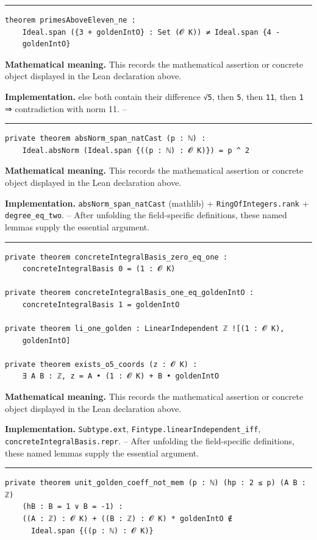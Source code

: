 \documentclass[UTF8,a4paper,11pt,fontset=fandol]{ctexart}
\theoremstyle{definition}
\newcommand{\statementsep}{\par\medskip\hrule\medskip}
\begin{document}
\statementsep
\begin{verbatim}
theorem primesAboveEleven_ne :
    Ideal.span ({3 + goldenIntO} : Set (𝓞 K)) ≠ Ideal.span {4 -
    goldenIntO}
\end{verbatim}
\noindent\textbf{Mathematical meaning.} This records the mathematical assertion or concrete object displayed in the Lean declaration above.\par
\noindent\textbf{Implementation.} else both contain their difference \texttt{√5}, then \texttt{5}, then \texttt{11}, then \texttt{1} ⇒ contradiction with norm 11. --\par
\statementsep
\begin{verbatim}
private theorem absNorm_span_natCast (p : ℕ) :
    Ideal.absNorm (Ideal.span {((p : ℕ) : 𝓞 K)}) = p ^ 2
\end{verbatim}
\noindent\textbf{Mathematical meaning.} This records the mathematical assertion or concrete object displayed in the Lean declaration above.\par
\noindent\textbf{Implementation.} \texttt{absNorm\_\allowbreak{}span\_\allowbreak{}natCast} (mathlib) + \texttt{RingOfIntegers.\allowbreak{}rank} + \texttt{degree\_\allowbreak{}eq\_\allowbreak{}two}. -- After unfolding the field-specific definitions, these named lemmas supply the essential argument.\par
\statementsep
\begin{verbatim}
private theorem concreteIntegralBasis_zero_eq_one :
    concreteIntegralBasis 0 = (1 : 𝓞 K)

private theorem concreteIntegralBasis_one_eq_goldenIntO :
    concreteIntegralBasis 1 = goldenIntO

private theorem li_one_golden : LinearIndependent ℤ ![(1 : 𝓞 K),
    goldenIntO]

private theorem exists_o5_coords (z : 𝓞 K) :
    ∃ A B : ℤ, z = A • (1 : 𝓞 K) + B • goldenIntO
\end{verbatim}
\noindent\textbf{Mathematical meaning.} This records the mathematical assertion or concrete object displayed in the Lean declaration above.\par
\noindent\textbf{Implementation.} \texttt{Subtype.\allowbreak{}ext}, \texttt{Fintype.\allowbreak{}linearIndependent\_\allowbreak{}iff}, \texttt{concreteIntegralBasis.\allowbreak{}repr}. -- After unfolding the field-specific definitions, these named lemmas supply the essential argument.\par
\statementsep
\begin{verbatim}
private theorem unit_golden_coeff_not_mem (p : ℕ) (hp : 2 ≤ p) (A B : ℤ)
    (hB : B = 1 ∨ B = -1) :
    ((A : ℤ) : 𝓞 K) + ((B : ℤ) : 𝓞 K) * goldenIntO ∉
      Ideal.span {((p : ℕ) : 𝓞 K)}
\end{verbatim}
\end{document}
